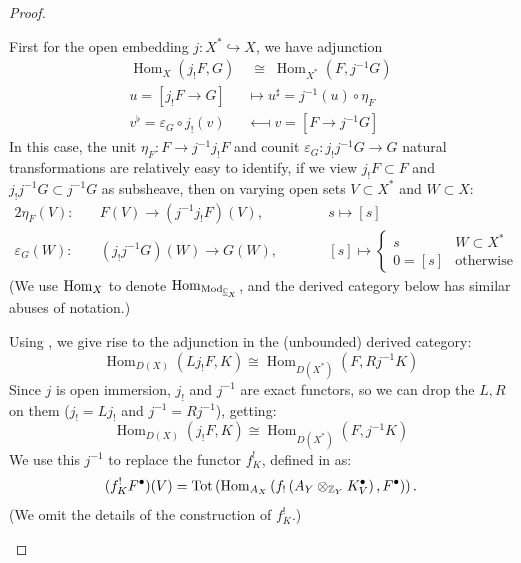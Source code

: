 \begin{proof}
\begin{enumerate}
              First for the open embedding $j: X^* \hookrightarrow X$, we have adjunction
              \begin{align*}
                  \operatorname{Hom}_X(j_!F,G)      & \; \cong \;  \operatorname{Hom}_{X^*}(F,j^{-1}G) \\
                  u=\left[j_!F\to G\right]          & \longmapsto u^\sharp=j^{-1}(u)\circ \eta_F       \\
                  v^\flat=\varepsilon_G\circ j_!(v) & \longmapsfrom v=\left[F\to j^{-1}G\right]
              \end{align*}
              In this case, the unit $\eta_F: F \to j^{-1}j_!F$ and counit $\varepsilon_G: j_!j^{-1}G \to G$ \cite[\href{https://stacks.math.columbia.edu/tag/0036}{Tag 0036}]{stacks-project} natural transformations are relatively easy to identify,
              if we view $j_!F \subset F$ and $j_!j^{-1}G \subset j^{-1}G$ as subsheave, then on varying open sets $V \subset X^*$ and $W \subset X$:
              \begin{alignat*}{2}
                  \eta_F(V): \quad        & F(V) \to (j^{-1}j_!F)(V), & \qquad & s \longmapsto [s]                                                                         \\
                  \varepsilon_G(W): \quad & (j_!j^{-1}G)(W) \to G(W), & \qquad & [s] \longmapsto \begin{cases} s & W \subset X^* \\ 0 = [s] & \text{otherwise} \end{cases}
              \end{alignat*}
              (We use $\operatorname{Hom}_X$ to denote $\operatorname{Hom}_{\mathrm{Mod}_{\underline{\mathbb{C}}_X}}$, and the derived category below has similar abuses of notation.)

              Using \cite[\href{https://stacks.math.columbia.edu/tag/0FND}{Tag 0FND}]{stacks-project}, we give rise to the adjunction in the (unbounded) derived category:
              \[
                  \operatorname{Hom}_{D(X)}(L j_! F,K) \cong \operatorname{Hom}_{D(X^*)}(F,R j^{-1} K)
              \]
              Since $j$ is open immersion, $j_!$ and $j^{-1}$ are exact functors, so we can drop the $L,R$ on them ($j_! = Lj_!$ and $j^{-1} = R j^{-1}$), getting:
              \[
                  \operatorname{Hom}_{D(X)}(j_! F,K) \cong \operatorname{Hom}_{D(X^*)}(F,j^{-1} K)
              \]
              We use this $j^{-1}$ to replace the functor $f^!_K$, defined in \cite[Thm.~3.1.5]{KashiwaraSchapira1994Sheaves} as:
              \[
                  (f^!_K F^\bullet)(V) = \mathrm{Tot}\left(\operatorname{Hom}_{A_X}\left(f_!\left(A_Y \otimes_{\mathbb{Z}_Y} K^\bullet_V\right), F^\bullet\right)\right).
              \]
              (We omit the details of the construction of $f^!_K$.)


\end{enumerate}
\end{proof}
